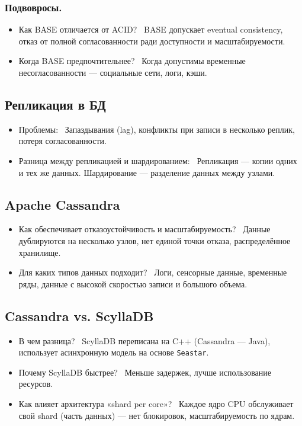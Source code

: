 \documentclass[a4paper,14pt]{article}
\begin{document}
\subsubsection*{Подвовросы.}
\begin{itemize}
\item Как BASE отличается от ACID? \
BASE допускает eventual consistency, отказ от полной согласованности ради доступности и масштабируемости.

\item Когда BASE предпочтительнее? \
Когда допустимы временные несогласованности — социальные сети, логи, кэши.
\end{itemize}

\subsection{Репликация в БД}

\begin{itemize}
\item Проблемы: \
Запаздывания (lag), конфликты при записи в несколько реплик, потеря согласованности.

\item Разница между репликацией и шардированием: \
Репликация — копии одних и тех же данных. Шардирование — разделение данных между узлами.
\end{itemize}

\subsection{Apache Cassandra}

\begin{itemize}
\item Как обеспечивает отказоустойчивость и масштабируемость? \
Данные дублируются на несколько узлов, нет единой точки отказа, распределённое хранилище.

\item Для каких типов данных подходит? \
Логи, сенсорные данные, временные ряды, данные с высокой скоростью записи и большого объема.
\end{itemize}

\subsection{Cassandra vs. ScyllaDB}

\begin{itemize}
\item В чем разница? \
ScyllaDB переписана на C++ (Cassandra — Java), использует асинхронную модель на основе \texttt{Seastar}.

\item Почему ScyllaDB быстрее? \
Меньше задержек, лучше использование ресурсов.

\item Как влияет архитектура «shard per core»? \
Каждое ядро CPU обслуживает свой shard (часть данных) — нет блокировок, масштабируемость по ядрам.
\end{itemize}
\end{document}
